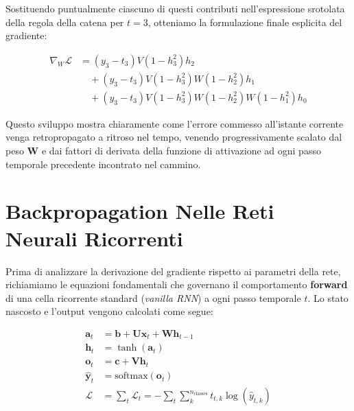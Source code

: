 ﻿\documentclass[11pt, a4paper]{article}
\begin{document}
Sostituendo puntualmente ciascuno di questi contributi nell'espressione srotolata della regola della catena per $t=3$, otteniamo la formulazione finale esplicita del gradiente:

\begin{align*}
\nabla_{W}\mathcal{L} &= \boxed{ (y_3 - t_3) V (1 - h_3^2) h_2 } \\
&\quad + \boxed{ (y_3 - t_3) V (1 - h_3^2) W (1 - h_2^2) h_1 } \\
&\quad + \boxed{ (y_3 - t_3) V (1 - h_3^2) W (1 - h_2^2) W (1 - h_1^2) h_0 }
\end{align*}

Questo sviluppo mostra chiaramente come l'errore commesso all'istante corrente venga retropropagato a ritroso nel tempo, venendo progressivamente scalato dal peso $\bm{W}$ e dai fattori di derivata della funzione di attivazione ad ogni passo temporale precedente incontrato nel cammino.

\section{Backpropagation Nelle Reti Neurali Ricorrenti}

Prima di analizzare la derivazione del gradiente rispetto ai parametri della rete, richiamiamo le equazioni fondamentali che governano il comportamento \textbf{forward} di una cella ricorrente standard (\emph{vanilla RNN}) a ogni passo temporale $t$. Lo stato nascosto e l'output vengono calcolati come segue:

\begin{align*}
\bm{a}_t &= \bm{b} + \bm{U}\bm{x}_t + \bm{W}\bm{h}_{t-1} \\
\bm{h}_t &= \tanh(\bm{a}_t) \\
\bm{o}_t &= \bm{c} + \bm{V}\bm{h}_t \\
\hat{\bm{y}}_t &= \text{softmax}(\bm{o}_t) \\
\mathcal{L} &= \sum_t \mathcal{L}_t = -\sum_t \sum_k^{n_{\text{classes}}} t_{t,k} \log(\hat{y}_{t,k})
\end{align*}
\end{document}
